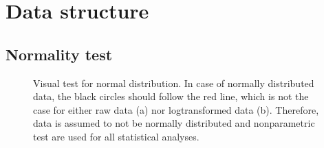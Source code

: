 \section{Data structure}

\subsection*{Normality test}
\begin{center}
	\begin{figure}[H]
		\caption[Testing normal distribution]{Visual test for normal distribution. In case of normally distributed data, the black circles should follow the red line, which is not the case for either raw data (a) nor logtransformed data (b). Therefore, data is assumed to not be normally distributed and nonparametric test are used for all statistical analyses.}
		\label{fig:NormDis}
	\end{figure}
\end{center}

